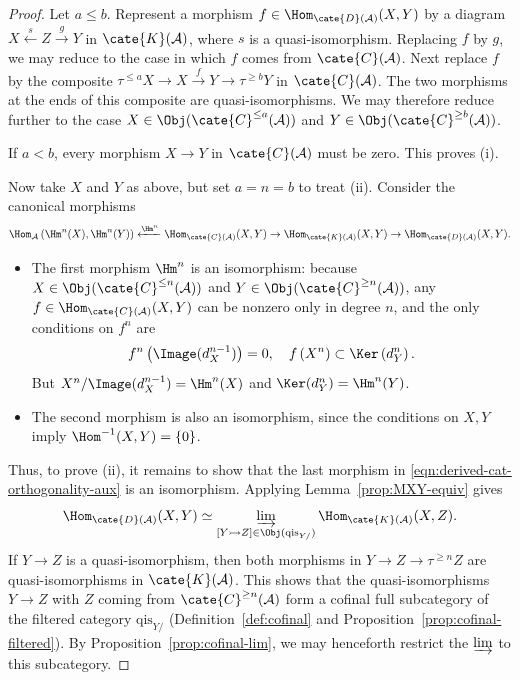 \begin{proof}
	Let $a\leq b$. Represent a morphism
	$f\in\Hom_{\cate{D}(\mathcal{A})}(X,Y)$ by a diagram
	$X\xleftarrow{s}Z\xrightarrow{g}Y$ in $\cate{K}(\mathcal{A})$, where
	$s$ is a quasi-isomorphism. Replacing $f$ by $g$, we may reduce to the
	case in which $f$ comes from $\cate{C}(\mathcal{A})$. Next replace $f$
	by the composite
	$\tau^{\leq a}X\to X\xrightarrow{f}Y\to\tau^{\geq b}Y$ in
	$\cate{C}(\mathcal{A})$. The two morphisms at the ends of this composite
	are quasi-isomorphisms. We may therefore reduce further to the case
	$X\in\Obj(\cate{C}^{\leq a}(\mathcal{A}))$ and
	$Y\in\Obj(\cate{C}^{\geq b}(\mathcal{A}))$.

	If $a<b$, every morphism $X\to Y$ in $\cate{C}(\mathcal{A})$ must be
	zero. This proves (i).

	Now take $X$ and $Y$ as above, but set $a=n=b$ to treat (ii). Consider
	the canonical morphisms
	\begin{equation}\label{eqn:derived-cat-orthogonality-aux}
		\Hom_{\mathcal{A}}\left( \Hm^n(X), \Hm^n(Y) \right) \xleftarrow{\Hm^n} \Hom_{\cate{C}(\mathcal{A})}(X, Y) \to \Hom_{\cate{K}(\mathcal{A})}(X, Y) \to \Hom_{\cate{D}(\mathcal{A})}(X, Y).
	\end{equation}
	\begin{itemize}
		\item The first morphism $\Hm^n$ is an isomorphism: because
		$X\in\Obj(\cate{C}^{\leq n}(\mathcal{A}))$ and
		$Y\in\Obj(\cate{C}^{\geq n}(\mathcal{A}))$, any
		$f\in\Hom_{\cate{C}(\mathcal{A})}(X,Y)$ can be nonzero only in
		degree $n$, and the only conditions on $f^n$ are
		\[ f^n\left( \Image(d_X^{n-1}) \right) = 0 , \quad f\left(X^n\right) \subset \Ker\left( d_Y^n \right). \]
		But $X^n/\Image(d_X^{n-1})=\Hm^n(X)$ and
		$\Ker(d_Y^n)=\Hm^n(Y)$.
		\item The second morphism is also an isomorphism, since the conditions
		on $X,Y$ imply $\Hom^{-1}(X,Y)=\{0\}$.
	\end{itemize}

	Thus, to prove (ii), it remains to show that the last morphism in
	\eqref{eqn:derived-cat-orthogonality-aux} is an isomorphism. Applying
	Lemma~\ref{prop:MXY-equiv} gives
	\[ \Hom_{\cate{D}(\mathcal{A})}(X, Y) \simeq \varinjlim_{[Y \rightarrowtail Z] \in \Obj(\mathrm{qis}_{Y/}) } \Hom_{\cate{K}(\mathcal{A})}(X, Z). \]
	If $Y\to Z$ is a quasi-isomorphism, then both morphisms in
	$Y\to Z\to\tau^{\geq n}Z$ are quasi-isomorphisms in
	$\cate{K}(\mathcal{A})$. This shows that the quasi-isomorphisms $Y\to Z$
	with $Z$ coming from $\cate{C}^{\geq n}(\mathcal{A})$ form a cofinal full
	subcategory of the filtered category $\mathrm{qis}_{Y/}$
	(Definition~\ref{def:cofinal} and
	Proposition~\ref{prop:cofinal-filtered}). By
	Proposition~\ref{prop:cofinal-lim}, we may henceforth restrict the
	$\varinjlim$ to this subcategory.


\end{proof}
